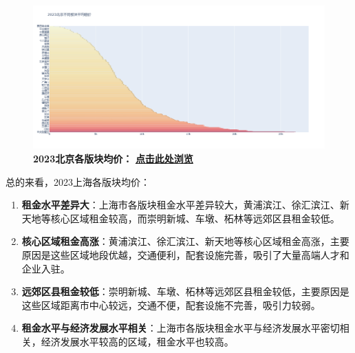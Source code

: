 \documentclass[lang=cn,11pt,a4paper]{elegantpaper}
\begin{document}
\begin{figure}[H]
    \centering
    \begin{minipage}{0.9\textwidth}
        \centering
        \includegraphics[width=\textwidth]{image/2023北京各版块.png}
        \textbf{2023北京各版块均价：} \href{https://yangchen-1318434888.cos.ap-beijing.myqcloud.com/images/2023%E5%8C%97%E4%BA%AC%E4%B8%8D%E5%90%8C%E6%9D%BF%E5%9D%97%E5%B9%B3%E5%9D%87%E7%A7%9F%E4%BB%B7.html}{\textbf{点击此处浏览}}
    \end{minipage}
\end{figure}

总的来看，2023上海各版块均价：

\begin{enumerate}
    \item \textbf{租金水平差异大}：上海市各版块租金水平差异较大，黄浦滨江、徐汇滨江、新天地等核心区域租金较高，而崇明新城、车墩、柘林等远郊区县租金较低。
    \item \textbf{核心区域租金高涨}：黄浦滨江、徐汇滨江、新天地等核心区域租金高涨，主要原因是这些区域地段优越，交通便利，配套设施完善，吸引了大量高端人才和企业入驻。
    \item \textbf{远郊区县租金较低}：崇明新城、车墩、柘林等远郊区县租金较低，主要原因是这些区域距离市中心较远，交通不便，配套设施不完善，吸引力较弱。
    \item \textbf{租金水平与经济发展水平相关}：上海市各版块租金水平与经济发展水平密切相关，经济发展水平较高的区域，租金水平也较高。
\end{enumerate}
\end{document}
